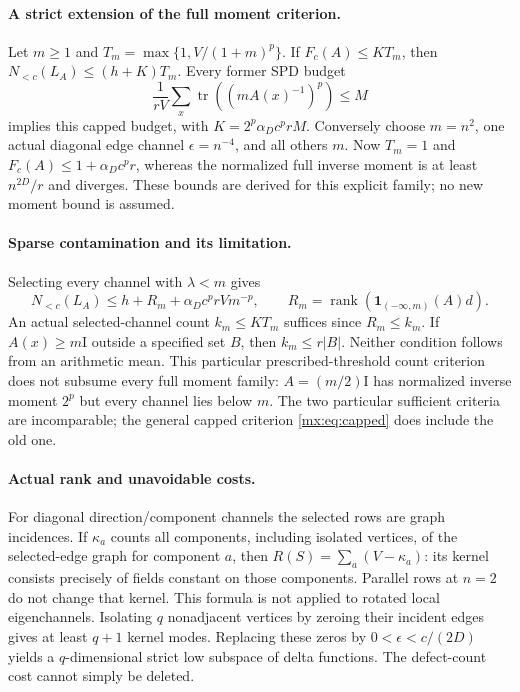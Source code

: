 \documentclass[11pt]{article}
\newcommand{\rank}{\operatorname{rank}}
\providecommand{\tr}{\operatorname{tr}}
\providecommand{\id}{\mathrm I}
\providecommand{\Nlow}{N_{<c}}
\begin{document}
\paragraph{A strict extension of the full moment criterion.}
Let $m\geq1$ and $T_m=\max\{1,V/(1+m)^p\}$. If $F_c(A)\leq KT_m$,
then $\Nlow(L_A)\leq(h+K)T_m$. Every former SPD budget
\[
 \frac1{rV}\sum_x\tr((mA(x)^{-1})^p)\leq M
\]
implies this capped budget, with $K=2^p\alpha_Dc^prM$.
Conversely choose $m=n^2$, one actual diagonal edge channel
$\epsilon=n^{-4}$, and all others $m$. Now $T_m=1$ and
$F_c(A)\leq1+\alpha_Dc^pr$, whereas the normalized full inverse moment is
at least $n^{2D}/r$ and diverges. These bounds are derived for this explicit
family; no new moment bound is assumed.

\paragraph{Sparse contamination and its limitation.}
Selecting every channel with $\lambda<m$ gives
\[
 \Nlow(L_A)\leq h+R_m+\alpha_Dc^prVm^{-p},
 \qquad R_m=\rank(\boldsymbol1_{(-\infty,m)}(A)d).
\]
An actual selected-channel count $k_m\leq KT_m$ suffices since $R_m\leq k_m$.
If $A(x)\geq m\id$ outside a specified set $B$, then $k_m\leq r|B|$.
Neither condition follows from an arithmetic mean. This particular
prescribed-threshold count criterion does not subsume every full moment
family: $A=(m/2)\id$ has normalized inverse moment $2^p$ but every channel
lies below $m$. The two particular sufficient criteria are incomparable;
the general capped criterion \eqref{mx:eq:capped} does include the old one.

\paragraph{Actual rank and unavoidable costs.}
For diagonal direction/component channels the selected rows are graph
incidences. If $\kappa_a$ counts all components, including isolated vertices,
of the selected-edge graph for component $a$, then
$R(S)=\sum_a(V-\kappa_a)$: its kernel consists precisely of fields constant
on those components. Parallel rows at $n=2$ do not change that kernel.
This formula is not applied to rotated local eigenchannels.
Isolating $q$ nonadjacent vertices by zeroing their incident edges gives
at least $q+1$ kernel modes. Replacing these zeros by
$0<\epsilon<c/(2D)$ yields a $q$-dimensional strict low subspace of delta
functions. The defect-count cost cannot simply be deleted.
\end{document}
